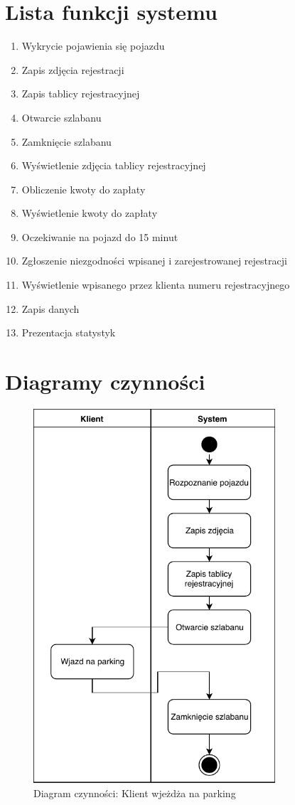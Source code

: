 \section{Lista funkcji systemu}


\begin{enumerate}
	\item Wykrycie pojawienia się pojazdu
	\item Zapis zdjęcia rejestracji
	\item Zapis tablicy rejestracyjnej
	\item Otwarcie szlabanu
	\item Zamknięcie szlabanu
	\item Wyświetlenie zdjęcia tablicy rejestracyjnej
	\item Obliczenie kwoty do zapłaty
	\item Wyświetlenie kwoty do zapłaty
	\item Oczekiwanie na pojazd do 15 minut
	\item Zgłoszenie niezgodności wpisanej i zarejestrowanej rejestracji
	\item Wyświetlenie wpisanego przez klienta numeru rejestracyjnego
	\item Zapis danych
	\item Prezentacja statystyk
\end{enumerate}

\section{Diagramy czynności}

\begin{figure}[H]
	\centering
	\includegraphics[width=90mm]{diagramy/DiagCzynWjazd.pdf}
	\caption{Diagram czynności: Klient wjeżdża na parking}
\end{figure}


